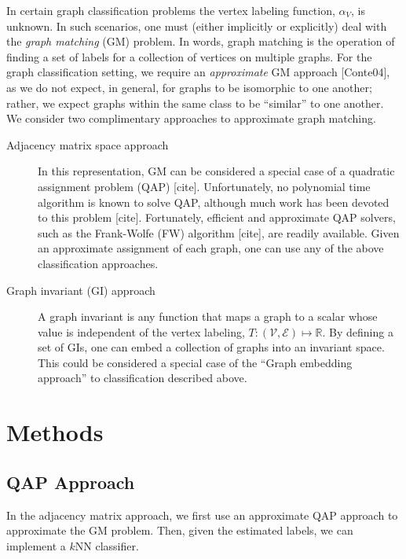 \documentclass{article} %
\providecommand{\mc}[1]{\mathcal{#1}}
\newcommand{\Real}{\mathbb{R}}
\begin{document}
In certain graph classification problems the vertex labeling function, $\alpha_V$, is unknown.  In such scenarios, one must (either implicitly or explicitly) deal with the \emph{graph matching} (GM) problem.  In words, graph matching is the operation of finding a set of labels for a collection of vertices on multiple graphs.  For the graph classification setting, we require an \emph{approximate} GM approach [Conte04], as we do not expect, in general, for graphs to be isomorphic to one another; rather, we expect graphs within the same class to be ``similar'' to one another.  We consider two complimentary approaches to approximate graph matching.
\begin{description}
	\item[Adjacency matrix space approach]  In this representation, GM can be considered a special case of a quadratic assignment problem (QAP) [cite].   Unfortunately, no polynomial time algorithm is known to solve QAP, although much work has been devoted to this problem [cite]. Fortunately, efficient and approximate QAP solvers, such as the Frank-Wolfe (FW) algorithm [cite], are readily available.  Given an approximate assignment of each graph, one can use any of the above classification approaches.
	\item[Graph invariant (GI) approach] A graph invariant is any function that maps a graph to a scalar whose value is independent of the vertex labeling, $T: (\mc{V},\mc{E}) \mapsto \Real$.  By defining a set of GIs, one can embed a collection of graphs into an invariant space.  This could be considered a special case of the ``Graph embedding approach'' to classification described above.		
\end{description}



\section{Methods} %
\label{sec:methods}

\subsection{QAP Approach} %
\label{sec:quadratic_assignment_problem}

In the adjacency matrix approach, we first use an approximate QAP approach to approximate the GM problem.  Then, given the estimated labels, we can implement a $k$NN classifier. 
\end{document}

